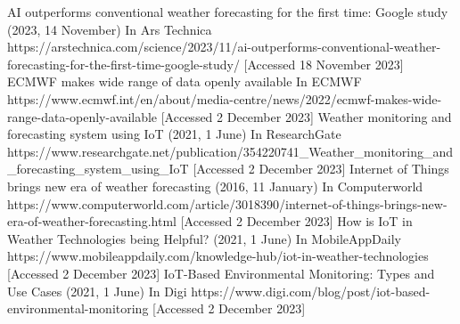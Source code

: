\documentclass[../paper.tex]{subfiles}
\begin{document}
\begin{thebibliography}{00}
     AI outperforms conventional weather forecasting for the first time: Google study (2023, 14 November) In Ars Technica https://arstechnica.com/science/2023/11/ai-outperforms-conventional-weather-forecasting-for-the-first-time-google-study/ [Accessed 18 November 2023]
     ECMWF makes wide range of data openly available In ECMWF https://www.ecmwf.int/en/about/media-centre/news/2022/ecmwf-makes-wide-range-data-openly-available [Accessed 2 December 2023]
     Weather monitoring and forecasting system using IoT (2021, 1 June) In ResearchGate https://www.researchgate.net/publication/354220741\_Weather\_monitoring\_and\_forecasting\_system\_using\_IoT [Accessed 2 December 2023]
     Internet of Things brings new era of weather forecasting (2016, 11 January) In Computerworld https://www.computerworld.com/article/3018390/internet-of-things-brings-new-era-of-weather-forecasting.html [Accessed 2 December 2023]
     How is IoT in Weather Technologies being Helpful? (2021, 1 June) In MobileAppDaily https://www.mobileappdaily.com/knowledge-hub/iot-in-weather-technologies [Accessed 2 December 2023]
     IoT-Based Environmental Monitoring: Types and Use Cases (2021, 1 June) In Digi https://www.digi.com/blog/post/iot-based-environmental-monitoring [Accessed 2 December 2023]
\end{thebibliography}
\end{document}

